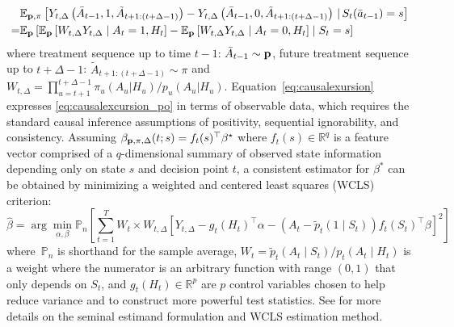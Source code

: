 \documentclass[lineno]{biometrika}
\def\E{\mathbb{E}}
\def\given{\, | \,}
\begin{document}
\begin{align}
&\E_{{\bf p}, \pi} \left [ Y_{t,\Delta} \left(\bar A_{t-1}, 1, \tilde A_{t+1:(t+\Delta-1)} \right) - Y_{t,\Delta} \left(\bar A_{t-1}, 0, \tilde A_{t+1:(t+\Delta-1)} \right) \given S_t (\bar a_{t-1}) = s\right] \label{eq:causalexcursion_po} \\
=  &\E_{{\bf p}} \left[ \E_{{\bf p}} \left[ W_{t,\Delta} Y_{t,\Delta} \mid A_t = 1, H_t \right] - \E_{{\bf p}} \left[ W_{t,\Delta} Y_{t,\Delta} \mid A_t = 0, H_t \right] \mid S_t = s \right] \label{eq:causalexursion}
\end{align}
where treatment sequence up to time $t-1$: $\bar A_{t-1} \sim {\bf p}$, future treatment sequence up to $t+\Delta-1$: $\tilde A_{t+1:(t+\Delta-1)} \sim \pi$ and~$W_{t,\Delta} = \prod_{u=t+1}^{t+\Delta-1} \pi_u (A_u | H_u) / p_u(A_u | H_u)$. 
Equation~\eqref{eq:causalexursion} expresses \eqref{eq:causalexcursion_po} in terms of observable data, which requires the standard causal inference assumptions of positivity, sequential ignorability, and consistency.  
Assuming $\beta_{{\bf p}, \pi, \Delta} (t;s) = f_t(s)^\top \beta^\star$ where $f_t(s) \in \mathbb{R}^q$ is a feature vector comprised of a $q$-dimensional summary of observed state information depending only on state $s$ and decision point $t$, a consistent estimator for $\beta^*$ can be obtained by minimizing a weighted and centered least squares (WCLS) criterion:
\begin{equation}
\label{eq:mrtstandard}
\hat \beta = \arg \min_{\alpha, \beta} \mathbb{P}_n \left[ \sum_{t=1}^T W_t \times W_{t,\Delta} \left[ Y_{t,\Delta} - g_t(H_t)^\top \alpha - \left ( A_t - \tilde p_t (1 \mid S_t) \right) f_t (S_t)^\top \beta \right]^2 \right]
\end{equation}
where~$\mathbb{P}_n$ is shorthand for the sample average, $W_t = \tilde p_t (A_t \mid S_t) / p_t (A_t \mid H_t)$ is a weight where the numerator is an arbitrary function with range $(0,1)$ that only depends on $S_t$, and $g_t(H_t) \in \mathbb{R}^p$ are $p$ control variables chosen to help reduce variance and to construct more powerful test statistics. See \citet{Boruvkaetal} for more details on the seminal estimand formulation and WCLS estimation method.
\end{document}

